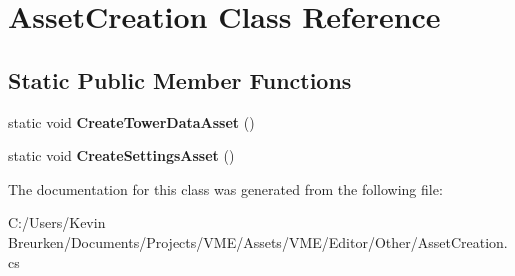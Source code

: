 \hypertarget{class_asset_creation}{}\section{Asset\+Creation Class Reference}
\label{class_asset_creation}
\subsection*{Static Public Member Functions}
\begin{DoxyCompactItemize}
\item 
static void {\bfseries Create\+Tower\+Data\+Asset} ()\hypertarget{class_asset_creation_a140ac6290587e885f573568e416e0761}{}\label{class_asset_creation_a140ac6290587e885f573568e416e0761}

\item 
static void {\bfseries Create\+Settings\+Asset} ()\hypertarget{class_asset_creation_a772f20ebcf583460a8a1d5e76f531d17}{}\label{class_asset_creation_a772f20ebcf583460a8a1d5e76f531d17}

\end{DoxyCompactItemize}


The documentation for this class was generated from the following file\+:\begin{DoxyCompactItemize}
\item 
C\+:/\+Users/\+Kevin Breurken/\+Documents/\+Projects/\+V\+M\+E/\+Assets/\+V\+M\+E/\+Editor/\+Other/Asset\+Creation.\+cs\end{DoxyCompactItemize}
